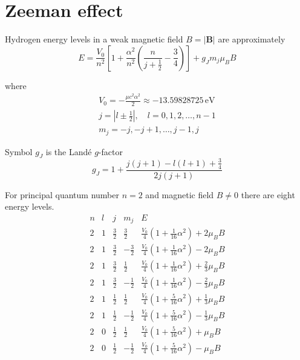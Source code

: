 

\section*{Zeeman effect}

Hydrogen energy levels in a weak magnetic field $B=|\mathbf B|$ are approximately
\begin{equation*}
E=\frac{V_0}{n^2}
\left[
1+\frac{\alpha^2}{n^2}\left(\frac{n}{j+\frac{1}{2}}-\frac{3}{4}\right)
\right]+g_Jm_j\mu_BB
\end{equation*}

where
\begin{gather*}
V_0=-\frac{\mu c^2\alpha^2}{2}\approx-13.59828725\,\text{eV}
\\[1ex]
j=\left|l\pm\tfrac{1}{2}\right|,\quad l=0,1,2,\ldots,n-1
\\[1ex]
m_j=-j,-j+1,\ldots,j-1,j
\end{gather*}

Symbol $g_J$ is the Land\'e $g$-factor
\begin{equation*}
g_J=1+\frac{j(j+1)-l(l+1)+\frac{3}{4}}{2j(j+1)}
\end{equation*}

For principal quantum number $n=2$ and magnetic field $B\ne0$ there are eight energy levels.
\begin{equation*}
\begin{matrix}
n & l & j & m_j & E
\\[2ex]
2 & 1 & \frac{3}{2} & \frac{3}{2} &
\frac{V_0}{4}\left(1+\tfrac{1}{16}\alpha^2\right)+2\mu_BB
\\[2ex]
2 & 1 & \frac{3}{2} & -\frac{3}{2} &
\frac{V_0}{4}\left(1+\tfrac{1}{16}\alpha^2\right)-2\mu_BB
\\[2ex]
2 & 1 & \frac{3}{2} & \frac{1}{2} &
\frac{V_0}{4}\left(1+\tfrac{1}{16}\alpha^2\right)+\frac{2}{3}\mu_BB
\\[2ex]
2 & 1 & \frac{3}{2} & -\frac{1}{2} &
\frac{V_0}{4}\left(1+\tfrac{1}{16}\alpha^2\right)-\frac{2}{3}\mu_BB
\\[2ex]
2 & 1 & \frac{1}{2} & \frac{1}{2} &
\frac{V_0}{4}\left(1+\tfrac{5}{16}\alpha^2\right)+\frac{1}{3}\mu_BB
\\[2ex]
2 & 1 & \frac{1}{2} & -\frac{1}{2} &
\frac{V_0}{4}\left(1+\tfrac{5}{16}\alpha^2\right)-\frac{1}{3}\mu_BB
\\[2ex]
2 & 0 & \frac{1}{2} & \frac{1}{2} &
\frac{V_0}{4}\left(1+\tfrac{5}{16}\alpha^2\right)+\mu_BB
\\[2ex]
2 & 0 & \frac{1}{2} & -\frac{1}{2} &
\frac{V_0}{4}\left(1+\tfrac{5}{16}\alpha^2\right)-\mu_BB
\end{matrix}
\end{equation*}


